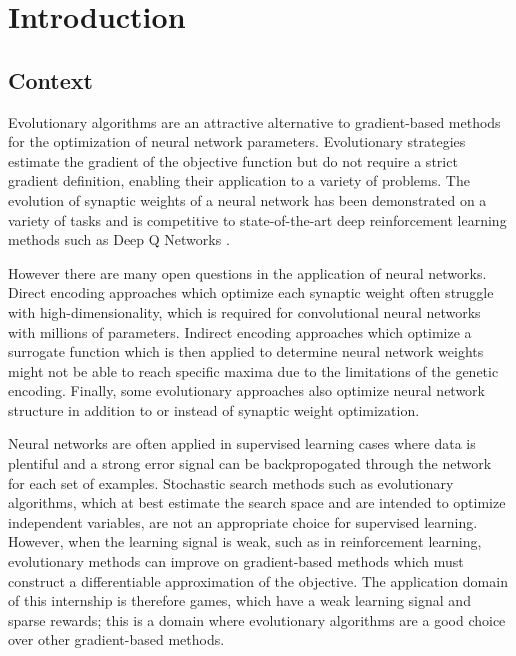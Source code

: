 \chapter*{Introduction}
\label{chap:introduction}

\section*{Context}
Evolutionary algorithms are an attractive alternative to gradient-based methods for the optimization of neural network parameters. Evolutionary strategies \cite{natural-evo-strat} estimate the gradient of the objective function but do not require a strict gradient definition, enabling their application to a variety of problems. The evolution of synaptic weights of a neural network has been demonstrated on a variety of tasks \cite{deep_neuroevo} and is competitive to state-of-the-art deep reinforcement learning methods such as Deep Q Networks \cite{human-lvl-control}. 

However there are many open questions in the application of neural networks. Direct encoding approaches which optimize each synaptic weight often struggle with high-dimensionality, which is required for convolutional neural networks with millions of parameters. Indirect encoding approaches which optimize a surrogate function which is then applied to determine neural network weights might not be able to reach specific maxima due to the limitations of the genetic encoding. Finally, some evolutionary approaches also optimize neural network structure in addition to or instead of synaptic weight optimization. 

Neural networks are often applied in supervised learning cases where data is plentiful and a strong error signal can be backpropogated through the network for each set of examples. Stochastic search methods such as evolutionary algorithms, which at best estimate the search space and are intended to optimize independent variables, are not an appropriate choice for supervised learning. However, when the learning signal is weak, such as in reinforcement learning, evolutionary methods can improve on gradient-based methods which must construct a differentiable approximation of the objective. The application domain of this internship is therefore games, which have a weak learning signal and sparse rewards; this is a domain where evolutionary algorithms are a good choice over other gradient-based methods.

